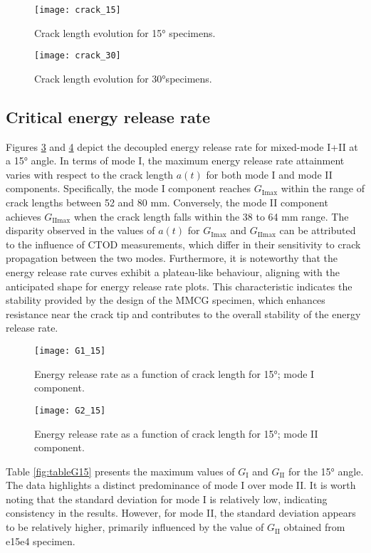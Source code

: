 \begin{figure}[htp]
	\centering
	\texttt{[image: crack\_15]}
	\caption{Crack length evolution for 15° specimens.}
	\label{fig:crack_15}
\end{figure}

\begin{figure}[htp]
	\centering
	\texttt{[image: crack\_30]}
	\caption{Crack length evolution for 30°specimens.}
	\label{fig:crack_30}
\end{figure}

\subsection{Critical energy release rate}

Figures \ref{fig:G1_15} and \ref{fig:G2_15} depict the decoupled energy release rate for mixed-mode I+II at a 15° angle.
In terms of mode I, the maximum energy release rate attainment varies with respect to the crack length $a(t)$ for both mode I and mode II components. Specifically, the mode I component reaches $G_\text{Imax}$ within the range of crack lengths between 52 and 80 mm. Conversely, the mode II component achieves $G_\text{IImax}$ when the crack length falls within the 38 to 64 mm range. The disparity observed in the values of $a(t)$ for $G_\text{Imax}$ and $G_\text{IImax}$ can be attributed to the influence of CTOD measurements, which differ in their sensitivity to crack propagation between the two modes.
Furthermore, it is noteworthy that the energy release rate curves exhibit a plateau-like behaviour, aligning with the anticipated shape for energy release rate plots. This characteristic indicates the stability provided by the design of the MMCG specimen, which enhances resistance near the crack tip and contributes to the overall stability of the energy release rate.

\begin{figure}[htp]
	\centering
	\texttt{[image: G1\_15]}
	\caption{Energy release rate as a function of crack length for 15°; mode I component.}
	\label{fig:G1_15}
\end{figure}

\begin{figure}[htp]
	\centering
	\texttt{[image: G2\_15]}
	\caption{Energy release rate as a function of crack length for 15°; mode II component.}
	\label{fig:G2_15}
\end{figure}

Table \ref{fig:tableG15} presents the maximum values of $G_\text{I}$ and $G_\text{II}$ for the 15° angle. The data highlights a distinct predominance of mode I over mode II. It is worth noting that the standard deviation for mode I is relatively low, indicating consistency in the results. However, for mode II, the standard deviation appears to be relatively higher, primarily influenced by the value of $G_\text{II}$ obtained from e15e4 specimen.

